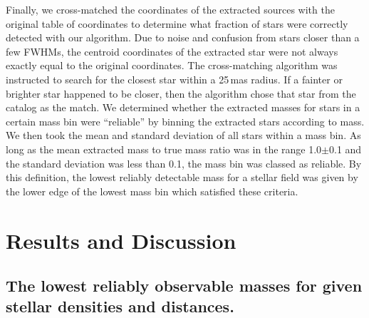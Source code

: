 \documentclass{aa}
\begin{document}
Finally, we cross-matched the coordinates of the extracted sources with the original table of coordinates to determine what fraction of stars were correctly detected with our algorithm.
Due to noise and confusion from stars closer than a few FWHMs, the centroid coordinates of the extracted star were not always exactly equal to the original coordinates.
The cross-matching algorithm was instructed to search for the closest star within a 25\,mas radius.
If a fainter or brighter star happened to be closer, then the algorithm chose that star from the catalog as the match.
We determined whether the extracted masses for stars in a certain mass bin were ``reliable'' by binning the extracted stars according to mass.
We then took the mean and standard deviation of all stars within a mass bin.
As long as the mean extracted mass to true mass ratio was in the range 1.0$\pm$0.1 and the standard deviation was less than 0.1, the mass bin was classed as reliable.
By this definition, the lowest reliably detectable mass for a stellar field was given by the lower edge of the lowest mass bin which satisfied these criteria.





\section{Results and Discussion}
\label{sec:results}

\subsection{The lowest reliably observable masses for given stellar densities and distances.}
  \label{subsec:lowest_mass}
\end{document}

